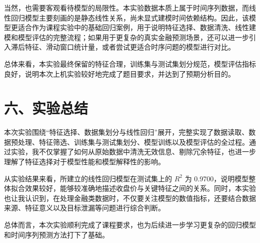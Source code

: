 \documentclass[12pt,a4paper]{ctexart}
\begin{document}
当然，也需要客观看待模型的局限性。本实验数据本质上属于时间序列数据，而线性回归模型主要刻画的是静态线性关系，尚未显式建模时间依赖结构。因此，该模型更适合作为课程实验中的基础回归案例，用于说明特征选择、数据清洗、线性建模和模型评估的完整流程；如果用于更复杂的真实金融预测场景，还可以进一步引入滞后特征、滑动窗口统计量，或者尝试更适合时序问题的模型进行对比。

总体来看，本实验最终保留的特征合理，训练集与测试集划分规范，模型评估指标良好，说明本次上机实验较好地完成了题目要求，并达到了预期分析目的。

\section*{六、实验总结}
本次实验围绕“特征选择、数据集划分与线性回归”展开，完整实现了数据读取、数据预处理、特征筛选、训练集与测试集划分、模型训练以及模型评估的全过程。通过实验，我不仅掌握了如何从原始数据中清洗无效信息、剔除冗余特征，也进一步理解了特征选择对于模型性能和模型解释性的影响。

从实验结果来看，所建立的线性回归模型在测试集上的 $R^2$ 为 0.9700，说明模型整体拟合效果较好，能够较准确地描述收盘价与关键特征之间的关系。同时，本实验也让我认识到，在处理金融类数据时，不仅要关注模型的数值指标，还要结合数据来源、特征意义以及目标泄漏等问题进行综合判断。

总体而言，本次实验顺利完成了课程要求，也为后续进一步学习更复杂的回归模型和时间序列预测方法打下了基础。
\end{document}
